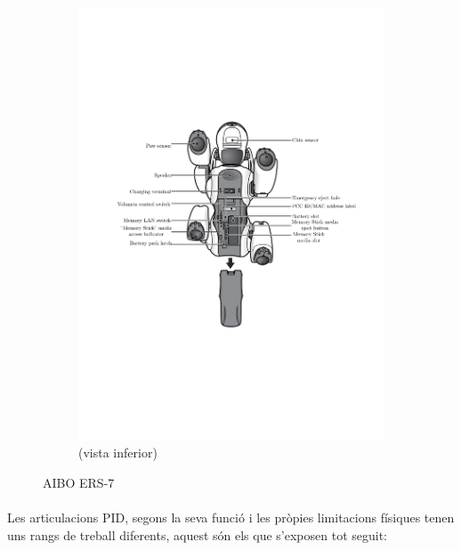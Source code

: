 \documentclass[12pt,a4paper,final,twoside]{article}
\begin{document}
\begin{figure}[h]
\begin{subfigure}[bl]{0.5\textwidth}
        			\includegraphics[width=\textwidth]{Imatges/ERS-7(stomach)}
                \caption{(vista inferior)}
        \end{subfigure}
        \caption{AIBO ERS-7 \cite{Aibo_Images}}
\end{figure}

\paragraph{}Les articulacions PID, segons la seva funció i les pròpies limitacions físiques tenen uns rangs de treball diferents, aquest són els que s'exposen tot seguit: 
\end{document}
